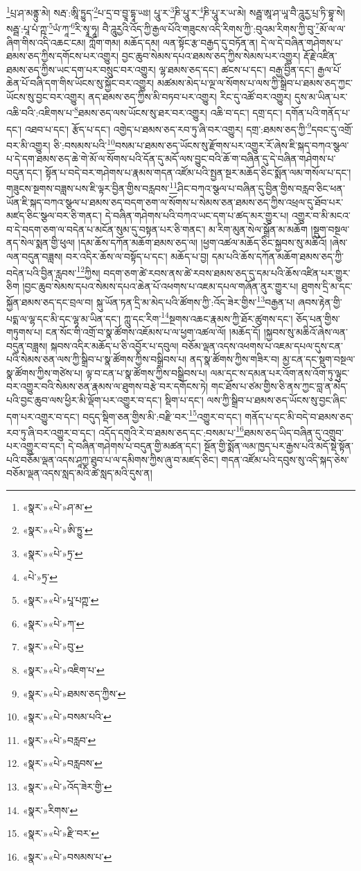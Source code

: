 \footnote{«སྣར་»«པེ་»ཤ་མ་}པྲ་ཤ་མནྟུ་མེ། སརྦ་:ཨཱི་ཏྱུད་\footnote{«སྣར་»«པེ་»ཨི་ཏྱུ་}པ་དྲ་བ་བྱཱ་དྷཱ་ཡཿ། པཱུ་ར་\footnote{«སྣར་»«པེ་»ཏྲ་}ཎི་པཱུ་ར་\footnote{«པེ་»ཏྲ་}ཎི་པཱུ་ར་ཡ་མེ། སརྦྦ་ཨཱ་ཤ་ཡཱ་བཻ་ཌཱུརྱ་པྲ་ཏི་བྷཱ་སེ། སརྦྦ་:པཱ་པཾ་ཀྵ་\footnote{«སྣར་»«པེ་»པཱ་པཀྵ་}ཡཾ་ཀཱ་\footnote{«སྣར་»«པེ་»ཀ་}རི་སྭཱ་ཧཱ། བཻ་ཌཱུརྱའི་འོད་ཀྱི་རྒྱལ་པོའི་གཟུངས་འདི་རིགས་ཀྱི་:བུའམ་རིགས་ཀྱི་བུ་\footnote{«སྣར་»«པེ་»བུ་}མོ་ལ་ལ་ཞིག་གིས་འདི་འཆང་ངམ། ཀློག་གམ། མཆོད་དམ། ལན་སྟོང་རྩ་བརྒྱད་དུ་བཏོན་ན། དེ་ལ་དེ་བཞིན་གཤེགས་པ་ཐམས་ཅད་ཀྱིས་དགོངས་པར་འགྱུར། བྱང་ཆུབ་སེམས་དཔའ་ཐམས་ཅད་ཀྱིས་སེམས་པར་འགྱུར། རྡོ་རྗེ་འཛིན་ཐམས་ཅད་ཀྱིས་ཡང་དག་པར་བསྲུང་བར་འགྱུར། ལྷ་ཐམས་ཅད་དང་། ཚངས་པ་དང་། བརྒྱ་བྱིན་དང་། རྒྱལ་པོ་ཆེན་པོ་བཞི་དག་གིས་ཡོངས་སུ་སྐྱོང་བར་འགྱུར། མཚམས་མེད་པ་ལྔ་ལ་སོགས་པ་ལས་ཀྱི་སྒྲིབ་པ་ཐམས་ཅད་ཀྱང་ཡོངས་སུ་བྱང་བར་འགྱུར། ནད་ཐམས་ཅད་ཀྱིས་མི་བཏབ་པར་འགྱུར། རིང་དུ་འཚོ་བར་འགྱུར། དུས་མ་ཡིན་པར་འཆི་བའི་:འཇིགས་པ་\footnote{«སྣར་»«པེ་»འཇིག་པ་}ཐམས་ཅད་ལས་ཡོངས་སུ་ཐར་བར་འགྱུར། འཆི་བ་དང་། དགྲ་དང་། དགོན་པའི་གནོད་པ་དང་། འཐབ་པ་དང་། རྩོད་པ་དང་། འགྱེད་པ་ཐམས་ཅད་རབ་ཏུ་ཞི་བར་འགྱུར། དགྲ་:ཐམས་ཅད་ཀྱི་\footnote{«སྣར་»«པེ་»ཐམས་ཅད་ཀྱིས་}དབང་དུ་འགྲོ་བར་མི་འགྱུར། ཅི་:བསམས་པའི་\footnote{«སྣར་»«པེ་»བསམ་པའི་}བསམ་པ་ཐམས་ཅད་ཡོངས་སུ་རྫོགས་པར་འགྱུར་རོ་ཞེས་ཇི་སྐད་བཀའ་སྩལ་པ་དེ་དག་ཐམས་ཅད་ཆེ་གེ་མོ་ལ་སོགས་པའི་དོན་དུ་མདོ་ལས་བྱུང་བའི་ཆོ་ག་བཞིན་དུ་དེ་བཞིན་གཤེགས་པ་བདུན་དང་། སྟོན་པ་བདེ་བར་གཤེགས་པ་རྣམས་གདན་འཛོམ་པའི་སྤྱན་སྔར་མཆོད་ཅིང་སྨོན་ལམ་གསོལ་པ་དང་། གཟུངས་སྔགས་བཟླས་པས་ཇི་ལྟར་བྱིན་གྱིས་བརླབས་\footnote{«སྣར་»«པེ་»བརླབ་}ཤིང་བཀའ་སྩལ་པ་བཞིན་དུ་བྱིན་གྱིས་བརླབ་ཅིང་ཕན་ཡོན་ཇི་སྐད་བཀའ་སྩལ་པ་ཐམས་ཅད་བདག་ཅག་ལ་སོགས་པ་སེམས་ཅན་ཐམས་ཅད་ཀྱིས་འཕྲལ་དུ་ཐོབ་པར་མཛད་ཅིང་སྩལ་བར་ཅི་གནང་། དེ་བཞིན་གཤེགས་པའི་བཀའ་ཡང་དག་པ་ཚད་མར་གྱུར་པ། འགྱུར་བ་མི་མངའ་བ་དེ་བདག་ཅག་ལ་བདེན་པ་མངོན་སུམ་དུ་བསྟན་པར་ཅི་གནང་། མ་རིག་མུན་སེལ་སྒྲོན་མ་མཆོག །སྡུག་བསྔལ་ནད་སེལ་སྨན་གྱི་ཕུལ། །དམ་ཆོས་དཀོན་མཆོག་ཐམས་ཅད་ལ། །ཕྱག་འཚལ་མཆོད་ཅིང་སྐྱབས་སུ་མཆིའོ། །ཞེས་ལན་བདུན་བཟླས། བར་འདིར་ཆོས་ལ་བསྟོད་པ་དང་། མཆོད་པ་བྱ། དམ་པའི་ཆོས་དཀོན་མཆོག་ཐམས་ཅད་ཀྱི་བདེན་པའི་བྱིན་རླབས་\footnote{«སྣར་»«པེ་»བརླབས་}ཀྱིས། བདག་ཅག་ཚེ་རབས་ནས་ཚེ་རབས་ཐམས་ཅད་དུ་དམ་པའི་ཆོས་འཛིན་པར་གྱུར་ཅིག །བྱང་ཆུབ་སེམས་དཔའ་སེམས་དཔའ་ཆེན་པོ་འཕགས་པ་འཇམ་དཔལ་གཞོན་ནུར་གྱུར་པ། ཐུགས་དྲི་མ་དང་སྐྱོན་ཐམས་ཅད་དང་བྲལ་བ། སྐུ་ཡོན་ཏན་དྲི་མ་མེད་པའི་ཚོགས་ཀྱི་:འོད་ཟེར་གྱིས་\footnote{«སྣར་»«པེ་»འོད་ཟེར་གྱི་}བརྒྱན་པ། ཞབས་རྟེན་གྱི་པདྨ་ལ་ལྷ་དང་མི་དང་ལྷ་མ་ཡིན་དང་། ཀླུ་དང་རིག་\footnote{«སྣར་»རིགས་}སྔགས་འཆང་རྣམས་ཀྱི་ཐོར་ཚུགས་དང་། ཅོད་པན་གྱིས་གཏུགས་པ། ངན་སོང་གི་འགྲོ་བ་སྣ་ཚོགས་འཇོམས་པ་ལ་ཕྱག་འཚལ་ལོ། །མཆོད་དོ། །སྐྱབས་སུ་མཆིའོ་ཞེས་ལན་བདུན་བཟླས། སྐབས་འདིར་མཆོད་པ་ཅི་འབྱོར་པ་དབུལ། བཅོམ་ལྡན་འདས་འཕགས་པ་འཇམ་དཔལ་དུས་ངན་པའི་སེམས་ཅན་ལས་ཀྱི་སྒྲིབ་པ་སྣ་ཚོགས་ཀྱིས་བསྒྲིབས་པ། ནད་སྣ་ཚོགས་ཀྱིས་གཟིར་བ། མྱ་ངན་དང་སྡུག་བསྔལ་སྣ་ཚོགས་ཀྱིས་གཙེས་པ། ལྟ་བ་ངན་པ་སྣ་ཚོགས་ཀྱིས་བསྒྲིབས་པ། ལམ་དང་ས་དམན་པར་འོག་ནས་འོག་ཏུ་ལྟུང་བར་འགྱུར་བའི་སེམས་ཅན་རྣམས་ལ་ཐུགས་བརྩེ་བར་དགོངས་ཏེ། གང་ཐོས་པ་ཙམ་གྱིས་ཅི་ནས་ཀྱང་བླ་ན་མེད་པའི་བྱང་ཆུབ་ལས་ཕྱིར་མི་ལྡོག་པར་འགྱུར་བ་དང་། སྡིག་པ་དང་། ལས་ཀྱི་སྒྲིབ་པ་ཐམས་ཅད་ཡོངས་སུ་བྱང་ཞིང་དག་པར་འགྱུར་བ་དང་། བདུད་སྡིག་ཅན་གྱིས་མི་:བརྫི་བར་\footnote{«སྣར་»«པེ་»རྫི་བར་}འགྱུར་བ་དང་། གནོད་པ་དང་མི་བདེ་བ་ཐམས་ཅད་རབ་ཏུ་ཞི་བར་འགྱུར་བ་དང་། འདོད་དགུའི་རེ་བ་ཐམས་ཅད་དང་:བསམ་པ་\footnote{«སྣར་»«པེ་»བསམས་པ་}ཐམས་ཅད་ཡིད་བཞིན་དུ་འགྲུབ་པར་འགྱུར་བ་དང་། དེ་བཞིན་གཤེགས་པ་བདུན་གྱི་མཚན་དང་། སྔོན་གྱི་སྨོན་ལམ་ཁྱད་པར་རྒྱས་པའི་མདོ་སྡེ་སྟོན་པའི་བཅོམ་ལྡན་འདས་ཤཱཀྱ་ཐུབ་པ་ལ་དམིགས་ཀྱིས་ཞུ་བ་མཛད་ཅིང་། གདན་འཛོམ་པའི་དབུས་སུ་འདི་སྐད་ཅེས་བཅོམ་ལྡན་འདས་སླད་མའི་ཚེ་སླད་མའི་དུས་ན། 